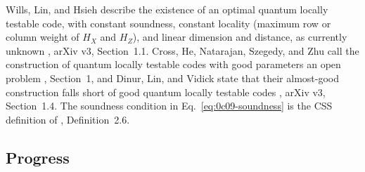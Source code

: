 Wills, Lin, and Hsieh describe the existence of an optimal quantum locally
testable code, with constant soundness, constant locality (maximum row or
column weight of $H_X$ and $H_Z$), and linear dimension and distance, as
currently unknown , arXiv v3, Section~1.1.
Cross, He, Natarajan, Szegedy, and Zhu call the construction of quantum
locally testable codes with good parameters an open problem
, Section~1, and Dinur, Lin, and Vidick
state that their almost-good construction falls short of good quantum locally
testable codes , arXiv v3, Section~1.4.  The
soundness condition in Eq.~\eqref{eq:0c09-soundness} is the CSS definition of
, Definition~2.6.

\subsection*{Progress}

